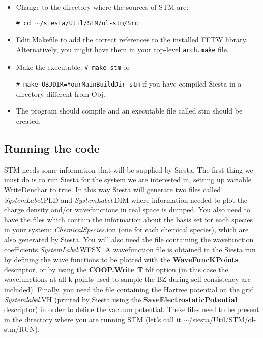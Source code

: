   \begin{itemize}

   \item Change to the directory where the sources of {\sc STM} are:

         {\tt \# cd $\sim$/siesta/Util/STM/ol-stm/Src}

   \item Edit Makefile to add the correct references to the installed
     FFTW library. Alternatively, you might have them in your top-level
     \texttt{arch.make} file.

   \item Make the executable:
         {\tt \# make stm} or
     
         {\tt \# make OBJDIR=YourMainBuildDir stm} if you have
         compiled Siesta in a directory different from Obj.

   \item The program should compile and an executable file called
         stm should be created.

  \end{itemize}

\subsection{Running the code}

 {\sc STM} needs some information that will be supplied by {\sc Siesta}. 
 The first thing we must do is to run {\sc Siesta} for 
 the system we are interested in,
 setting up variable WriteDenchar to true. 
 In this way {\sc Siesta} will generate
 two files called {\it SystemLabel}.PLD and {\it SystemLabel}.DIM
 where information 
 needed to plot the charge density and/or wavefunctions 
 in real space is dumped. You also need to have the files which
 contain the information about the basis set for each species
 in your system: {\it ChemicalSpecies}.ion (one for each
 chemical species), which
 are also generated by  {\sc Siesta}.
 You will also need the file containing the
 wavefunction coefficients {\it SystemLabel}.WFSX. 
 A wavefunction file is obtained
 in the {\sc Siesta} run by defining the wave functions to be
 plotted with the {\bf WaveFuncKPoints} descriptor, or by using the
 {\bf COOP.Write T} fdf option (in this case the
 wavefunctions at all k-points used to sample the BZ during
 self-consistency are included).
 Finally, you need the file containing the Hartree potential on the grid 
 {\it Systemlabel}.VH (printed by {\sc Siesta} using the 
 {\bf SaveElectrostaticPotential} descriptor)
 in order to define the vacuum potential. 
 These files need to be present in the
 directory where you are running {\sc STM} (let's call it
 $\sim$/siesta/Util/STM/ol-stm/RUN).

